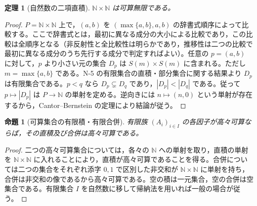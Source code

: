\documentclass[a5paper,10pt,dvipdfmx]{jsarticle}
\theoremstyle{definition}
\theoremstyle{plain}
\newtheorem{prop}[ruledef]{命題}
\newtheorem{thm}[ruledef]{定理}
\begin{document}
\begin{thm}[自然数の二項直積]\label{k142}
$\mathbb N\times\mathbb N$ は可算無限である。
\end{thm}
\begin{proof}
$P=\mathbb N\times\mathbb N$ 上で，$(a,b)$ を $(\max\{a,b\},a,b)$ の辞書式順序によって比較する。ここで辞書式とは，最初に異なる成分の大小による比較であり，この比較は全順序となる（非反射性と全比較性は明らかであり，推移性は二つの比較で最初に異なる成分のうち先行する成分で判定すればよい）。任意の $p=(a,b)$ に対して，$p$ より小さい元の集合 $D_p$ は $S(m)\times S(m)$ に含まれる。ただし $m=\max\{a,b\}$ である。N-5 の有限集合の直積・部分集合に関する結果より $D_p$ は有限集合である。$p<q$ なら $D_p\subsetneq D_q$ であり，$|D_p|<|D_q|$ である。従って $p\mapsto |D_p|$ は $P\to\mathbb N$ の単射を定める。逆向きには $n\mapsto(n,0)$ という単射が存在するから，Cantor--Bernstein の定理により結論が従う。
\end{proof}
\begin{prop}[可算集合の有限積・有限合併]\label{k143}
有限族 $(A_i)_{i\in I}$ の各因子が高々可算ならば，その直積及び合併は高々可算である。
\end{prop}
\begin{proof}
二つの高々可算集合については，各々の $\mathbb N$ への単射を取り，直積の単射を $\mathbb N\times\mathbb N$ に入れることにより，直積が高々可算であることを得る。合併については二つの集合をそれぞれ添字 $0,1$ で区別した非交和が $\mathbb N\times\mathbb N$ に単射を持ち，合併は非交和の像であるから高々可算である。空の積は一元集合，空の合併は空集合である。有限集合 $I$ を自然数に移して帰納法を用いれば一般の場合が従う。
\end{proof}
\end{document}
